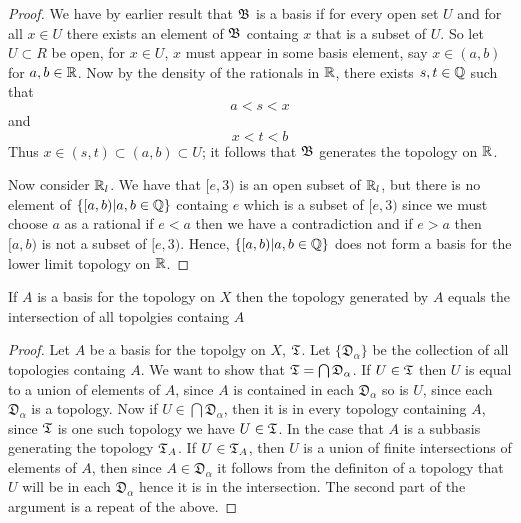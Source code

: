 \begin{proof}
    We have by earlier result that $\mathfrak{B}$ is a basis if for every open set $U$ and for all $x \in U$ there exists an element of $\mathfrak{B}$ 
    containg $x$ that is a subset of $U$. So let $U \subset R$ be open, for $x \in U$, $x$ must appear in some basis element, say $x \in (a, b)$ for $a, b \in \mathbb{R}$. Now by the density of the rationals in $\mathbb{R}$, there exists 
    $s, t \in \mathbb{Q}$ such that 
    \[a < s < x\]
    and 
    \[x < t < b\]
    Thus $x \in (s, t) \subset (a, b) \subset U$; it follows that $\mathfrak{B}$ generates the topology on $\mathbb{R}$. 

    Now consider $\mathbb{R}_l$. We have that $[e, 3)$ is an open subset of $\mathbb{R}_l$, but there is no element of $\{[a, b)| a, b \in \mathbb{Q}\}$ containg $e$ which is a subset 
    of $[e, 3)$ since we must choose $a$ as a rational if $e < a$ then we have a contradiction and if $e > a$ then $[a, b)$ is not a subset of $[e, 3)$. Hence, 
    $\{[a, b)| a, b \in \mathbb{Q}\}$ does not form a basis for the lower limit topology on $\mathbb{R}$.  
\end{proof}


\newpage
\question
If $A$ is a basis for the topology on $X$ then the topology generated by $A$ equals the intersection of all topolgies containg $A$ 


\begin{proof}
    Let $A$ be a basis for the topolgy on $X$, $\mathfrak{T}$. Let $\{ \mathfrak{D}_{\alpha} \}$ be the collection of all topologies containg $A$. 
    We want to show that $\mathfrak{T} = \bigcap \mathfrak{D}_\alpha$. If $U \in \mathfrak{T}$ then $U$ is equal to a union of elements of $A$, since
    $A$ is contained in each $\mathfrak{D}_\alpha$ so is $U$, since each $\mathfrak{D}_\alpha$ is a topology. Now if $U \in \bigcap \mathfrak{D}_\alpha$, 
    then it is in every topology containing $A$, since $\mathfrak{T}$ is one such topology we have $U \in \mathfrak{T}$.  In the case that $A$ is a subbasis generating 
    the topology $\mathfrak{T}_A$. If $U \in \mathfrak{T}_A$, then $U$ is a union of finite intersections of elements of $A$, then since $A \in \mathfrak{D}_\alpha$ it follows 
    from the definiton of a topology that $U$ will be in each $\mathfrak{D}_\alpha$ hence it is in the intersection. The second part of the argument is a repeat of the above. 

\end{proof}



